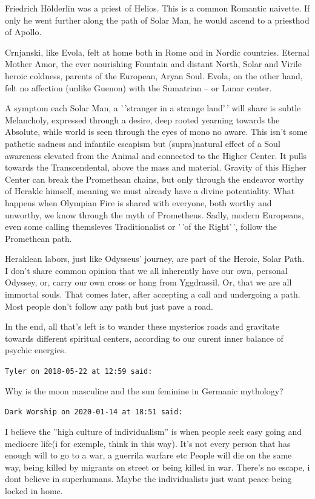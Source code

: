 \begin{footnotesize}
\begin{sffamily}
Friedrich Hölderlin was a priest of Helios. This is a common Romantic naivette. If only he went further along the path of Solar Man, he would ascend to a priesthod of Apollo.

Crnjanski, like Evola, felt at home both in Rome and in Nordic countries. Eternal Mother Amor, the ever nourishing Fountain and distant North, Solar and Virile heroic coldness, parents of the European, Aryan Soul. Evola, on the other hand, felt no affection (unlike Guenon) with the Sumatrian -- or Lunar center.

A symptom each Solar Man, a '\,'stranger in a strange land'\,' will share is subtle Melancholy, expressed through a desire, deep rooted yearning towards the Absolute, while world is seen through the eyes of mono no aware. This isn't some pathetic sadness and infantile escapism but (supra)natural effect of a Soul awareness elevated from the Animal and connected to the Higher Center. It pulls towards the Transcendental, above the mass and material. Gravity of this Higher Center can break the Promethean chains, but only through the endeavor worthy of Herakle himself, meaning we must already have a divine potentiality. What happens when Olympian Fire is shared with everyone, both worthy and unworthy, we know through the myth of Prometheus. Sadly, modern Europeans, even some calling themsleves Traditionalist or '\,'of the Right'\,', follow the Promethean path.

Heraklean labors, just like Odysseus' journey, are part of the Heroic, Solar Path. I don't share common opinion that we all inherently have our own, personal Odyssey, or, carry our own cross or hang from Yggdrassil. Or, that we are all immortal souls. That comes later, after accepting a call and undergoing a path. Most people don't follow any path but just pave a road.

In the end, all that's left is to wander these mysterios roads and gravitate towards different spiritual centers, according to our curent inner balance of psychic energies.

\hfill

\texttt{Tyler on 2018-05-22 at 12:59 said:}

Why is the moon masculine and the sun feminine in Germanic mythology?

\hfill

\texttt{Dark Worship on 2020-01-14 at 18:51 said:}

I believe the ''high culture of individualism'' is when people seek easy going and mediocre life(i for exemple, think in this way). It's not every person that has enough will to go to a war, a guerrila warfare etc People will die on the same way, being killed by migrants on street or being killed in war. There's no escape, i dont believe in superhumans. Maybe the individualists just want peace being locked in home.


\end{sffamily}
\end{footnotesize}
